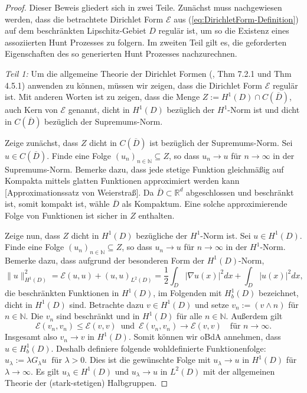 \documentclass[10pt, a4paper, leqno, twoside, bibliography=totocnumbered, final]{scrartcl}
\theoremstyle{definition}
\theoremstyle{plain}%
\theoremstyle{remark}
\begin{document}
\begin{proof}
Dieser Beweis gliedert sich in zwei Teile. Zunächst muss nachgewiesen werden, dass die betrachtete Dirichlet Form $\mathcal{E}$ aus (\ref{eq:DirichletForm-Definition}) auf dem beschränkten Lipschitz-Gebiet $D$ regulär ist, um so die Existenz eines assoziierten Hunt Prozesses zu folgern. Im zweiten Teil gilt es, die geforderten Eigenschaften  des so generierten Hunt Prozesses nachzurechnen.

\emph{Teil 1:} Um die allgemeine Theorie der Dirichlet Formen (\cite{Fukushima}, Thm 7.2.1 und Thm 4.5.1) anwenden zu können, müssen wir zeigen, dass die Dirichlet Form $ \mathcal{E} $ regulär ist. Mit anderen Worten ist zu zeigen, dass die Menge $ Z := H^1(D) \cap C(\overline{D}) $, auch Kern von $ \mathcal{E} $ genannt, dicht in $ H^1(D) $ bezüglich der $ H^1 $-Norm ist und dicht in $ C(\overline{D}) $ bezüglich der Supremums-Norm.

Zeige zunächst, dass $ Z $ dicht in  $ C(\overline{D}) $ ist bezüglich der Supremums-Norm. Sei $ u \in C(\overline{D}) $. Finde eine Folge $ (u_n)_{n \in \mathbb{N} } \subseteq Z $, so dass $ u_n \to u $ für $ n \to \infty $ in der Supremums-Norm. Bemerke dazu, dass jede stetige Funktion gleichmäßig auf Kompakta mittels glatten Funktionen approximiert werden kann [Approximationssatz von Weierstraß]. Da $ \overline{D} \subset \mathbb{R}^d $ abgeschlossen und beschränkt ist, somit kompakt ist, wähle $ \overline{D} $ als Kompaktum. Eine solche approximierende Folge von Funktionen ist sicher in $ Z $ enthalten.

Zeige nun, dass $Z$ dicht in $H^1(D)$ bezügliche der $ H^1 $-Norm ist. Sei $ u \in H^1(D) $. Finde eine Folge $ (u_n)_{n \in \mathbb{N} } \subseteq Z $, so dass $ u_n \to u $ für $ n \to \infty $ in der $ H^1 $-Norm. Bemerke dazu, dass aufgrund der besonderen Form der $H^1(D)$-Norm, 
\begin{equation}
\| u \|^2_{H^1(D)} = \mathcal{E} (u,u) + (u,u)_{L^2(D)} = \frac{1}{2} \int_D | \nabla u(x) |^2 dx + \int_D | u(x) |^2 dx,
\end{equation}
die beschränkten Funktionen in $H^1(D)$, im Folgenden mit $ H^1_b(D) $ bezeichnet, dicht in $H^1(D)$ sind. Betrachte dazu $ v \in H^1(D) $ und setze $ v_n := (v \wedge n) $ für $ n \in \mathbb{N} $. Die $v_n$ sind beschränkt und in $ H^1(D) $ für alle $ n \in \mathbb{N} $. Außerdem gilt
\begin{equation}
\mathcal{E}(v_n,v_n) \leq \mathcal{E}(v,v) \, \text{ und } \, \mathcal{E}(v_n,v_n) \to \mathcal{E}(v,v) \quad \text{für } n \to \infty.
\end{equation}
Insgesamt also $ v_n \to v $ in $ H^1(D) $. Somit können wir oBdA annehmen, dass $ u \in H^1_b(D) $. Deshalb definiere folgende wohldefinierte Funktionenfolge: $ u_{\lambda} := \lambda G_{\lambda} u \; \text{ für } \lambda > 0$. Dies ist die gewünschte Folge mit $ u_{\lambda} \to u $ in $ H^1(D) $ für $ \lambda \to \infty $. Es gilt $ u_{\lambda} \in H^1(D) $ und $ u_{\lambda} \to u $ in $ L^2(D) $ mit der allgemeinen Theorie der (stark-stetigen) Halbgruppen.


\end{proof}
\end{document}
